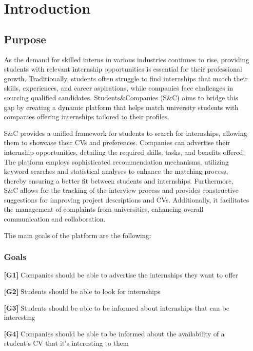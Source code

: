 \chapter{Introduction}

\section{Purpose}
As the demand for skilled interns in various industries continues to rise, providing students with relevant internship opportunities is essential for their professional growth. 
Traditionally, students often struggle to find internships that match their skills, experiences, and career aspirations, while companies face challenges in sourcing qualified candidates. 
Students\&Companies (S\&C) aims to bridge this gap by creating a dynamic platform that helps match university students with companies offering internships tailored to their profiles.

S\&C provides a unified framework for students to search for internships, allowing them to showcase their CVs and preferences. 
Companies can advertise their internship opportunities, detailing the required skills, tasks, and benefits offered.
The platform employs sophisticated recommendation mechanisms, utilizing keyword searches and statistical analyses to enhance the matching process, thereby ensuring a better fit between students and internships.
Furthermore, S\&C allows for the tracking of the interview process and provides constructive suggestions for improving project descriptions and CVs. Additionally, it facilitates the management of complaints from universities, enhancing overall communication and collaboration. 

The main goals of the platform are the following:

\subsection{Goals}

\textbf{[G1]} Companies should be able to advertise the internships they want to offer 

\textbf{[G2]} Students should be able to look for internships 

\textbf{[G3]} Students should be able to be informed about internships that can be interesting  

\textbf{[G4]} Companies should be able to be informed about the availability of a student's CV that it's interesting to them

